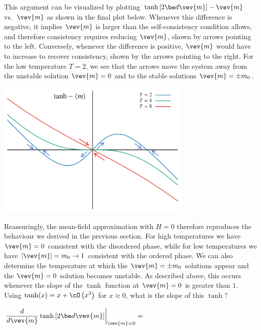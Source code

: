 This argument can be visualized by plotting $\tanh\left[2\be d\vev{m}\right] - \vev{m}$ vs.\ $\vev{m}$ as shown in the final plot below.
Whenever this difference is negative, it implies $\vev{m}$ is larger than the self-consistency condition allows, and therefore consistency requires reducing $\vev{m}$, shown by arrows pointing to the left.
Conversely, whenever the difference is positive, $\vev{m}$ would have to increase to recover consistency, shown by the arrows pointing to the right.
For the low temperature $T = 2$, we see that the arrows move the system away from the unstable solution $\vev{m} = 0$ and to the stable solutions $\vev{m} = \pm m_0$.

\begin{center}\includegraphics[width=0.7\textwidth]{figs/unit09_consistency_flow.pdf}\end{center}

Reassuringly, the mean-field approximation with $H = 0$ therefore reproduces the behaviour we derived in the previous section.
For high temperatures we have $\vev{m} = 0$ consistent with the disordered phase, while for low temperatures we have $|\vev{m}| = m_0 \to 1$ consistent with the ordered phase.
We can also determine the temperature at which the $\vev{m} = \pm m_0$ solutions appear and the $\vev{m} = 0$ solution becomes unstable.
As described above, this occurs whenever the slope of the $\tanh$ function at $\vev{m} = 0$ is greater than $1$.
Using $\tanh(x) = x + \cO\left(x^3\right)$ for $x \approx 0$, what is the slope of this $\tanh$?
\begin{mdframed}
  $\displaystyle \left. \frac{d}{d\vev{m}} \tanh\left[2\be d\vev{m}\right]\right|_{\vev{m} = 0} = $ \\[50 pt]
\end{mdframed}


